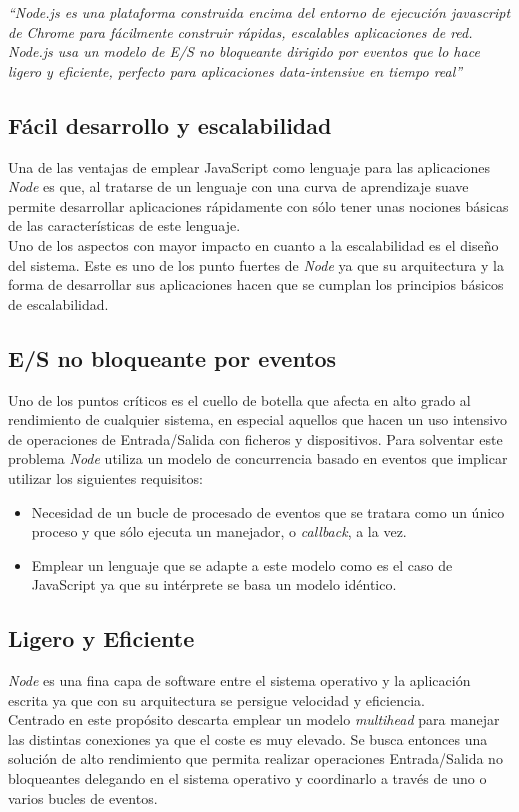 {\textit{“Node.js es una plataforma construida encima del entorno de ejecución javascript
de Chrome para fácilmente construir rápidas, escalables aplicaciones de red.
Node.js usa un modelo de E/S no bloqueante dirigido por eventos que lo hace ligero
y eficiente, perfecto para aplicaciones data-intensive en tiempo real”}
\subsection*{Fácil desarrollo y escalabilidad}
Una de las ventajas de emplear JavaScript como lenguaje para las aplicaciones \textit{Node} es que, al tratarse de un lenguaje con una curva de aprendizaje suave permite desarrollar aplicaciones rápidamente con sólo tener unas nociones básicas de las características de este lenguaje.
\\Uno de los aspectos con mayor impacto en cuanto a la escalabilidad es el diseño del sistema. Este es uno de los punto fuertes de \textit{Node} ya que su arquitectura y la forma de desarrollar sus aplicaciones hacen que se cumplan los principios básicos de escalabilidad.
\subsection*{E/S no bloqueante por eventos}
Uno de los puntos críticos es el cuello de botella que afecta en alto grado al rendimiento de cualquier sistema, en especial aquellos que hacen un uso intensivo de operaciones de Entrada/Salida con ficheros y dispositivos. Para solventar este problema \textit{Node} utiliza un modelo de concurrencia basado en eventos que implicar utilizar los siguientes requisitos:
\begin{itemize}
\item Necesidad de un bucle de procesado de eventos que se tratara como un único proceso y que sólo ejecuta un manejador, o \textit{callback}, a la vez.
\item  Emplear un lenguaje que se adapte a este modelo como es el caso de JavaScript ya que su intérprete se basa un modelo idéntico.
\end{itemize}
\subsection*{Ligero y Eficiente}
\textit{Node} es una fina capa de software entre el sistema operativo y la aplicación escrita ya que con su arquitectura se persigue velocidad y eficiencia.
\\Centrado en este propósito descarta emplear un modelo \textit{multihead} para manejar las distintas conexiones ya que el coste es muy elevado. Se busca entonces una solución de alto rendimiento que permita realizar operaciones Entrada/Salida no bloqueantes delegando en el sistema operativo y coordinarlo a través de uno o varios bucles de eventos.
}
